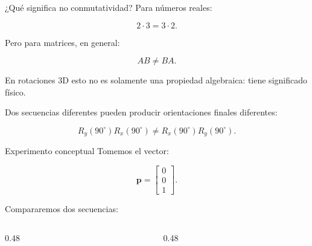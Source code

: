 \documentclass[aspectratio=169,10pt]{beamer}
\begin{document}
\begin{frame}{¿Qué significa no conmutatividad?}
    \small
    Para números reales:

    \[
    2\cdot3=3\cdot2.
    \]

    Pero para matrices, en general:

    \[
    AB\neq BA.
    \]

    En rotaciones 3D esto no es solamente una propiedad algebraica: tiene significado físico.

    \vspace{0.15cm}
    Dos secuencias diferentes pueden producir orientaciones finales diferentes:

    \[
    R_y(90^\circ)R_x(90^\circ)
    \neq
    R_x(90^\circ)R_y(90^\circ).
    \]

\end{frame}

\begin{frame}{Experimento conceptual}
    \small
    Tomemos el vector:

    \[
    \boldsymbol{p}=\begin{bmatrix}0\\0\\1\end{bmatrix}.
    \]

    Compararemos dos secuencias:

    \vspace{0.10cm}

    \begin{columns}[T]
        \begin{column}{0.48\textwidth}
        \end{column}
        \begin{column}{0.48\textwidth}
        \end{column}
    \end{columns}

\end{frame}
\end{document}
